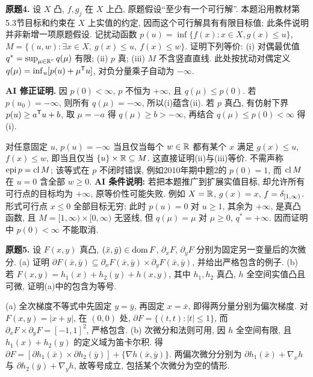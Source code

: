 \begin{exercise}\label{ass:6253-hw5-q4}
\textbf{原题4.} 设 $X$ 凸, $f,g_j$ 在 $X$ 上凸, 原题假设“至少有一个可行解”. 本题沿用教材第5.3节目标和约束在 $X$ 上实值的约定, 因而这个可行解具有有限目标值; 此条件说明并非新增一项原题假设. 记扰动函数 $p(u)=\inf\{f(x):x\in X,g(x)\le u\}$,
$M=\{(u,w):\exists x\in X,\ g(x)\le u,\ f(x)\le w\}$.
证明下列等价: (i) 对偶最优值 $q^*=\sup_{\mu\in\mathbb R^r}q(\mu)$ 有限; (ii) $p$ 真; (iii) $M$ 不含竖直直线. 此处按扰动对偶定义 $q(\mu)=\inf_u[p(u)+\mu^{\mathsf T} u]$, 对负分量乘子自动为 $-\infty$.
\end{exercise}
\begin{solution}
\textbf{AI 修正证明.} 因 $p(0)<\infty$, $p$ 不恒为 $+\infty$, 且 $q(\mu)\le p(0)$. 若 $p(u_0)=-\infty$, 则所有 $q(\mu)=-\infty$, 所以(i)蕴含(ii). 若 $p$ 真凸, 有仿射下界 $p(u)\ge a^{\mathsf T} u+b$, 取 $\mu=-a$ 得 $q(\mu)\ge b> -\infty$, 再结合 $q(\mu)\le p(0)<\infty$ 得(i).

对任意固定 $u$, $p(u)=-\infty$ 当且仅当每个 $w\in\mathbb R$ 都有某个 $x$ 满足 $g(x)\le u$, $f(x)\le w$, 即当且仅当 $\{u\}\times\mathbb R\subseteq M$. 这直接证明(ii)与(iii)等价. 不需声称 $\operatorname{epi} p=\operatorname{cl} M$; 该等式在 $p$ 不闭时错误, 例如2010年期中题2的 $p(0)=1$, 而 $\operatorname{cl} M$ 在 $u=0$ 含全部 $w\ge0$.
\textbf{AI 条件说明:} 若把本题推广到扩展实值目标, 却允许所有可行点的目标均为 $+\infty$, 原等价性可能失败. 例如 $X=\mathbb R$, $g(x)=x$, $f=\delta_{[1,\infty)}$. 形式可行点 $x\le0$ 全部目标无穷; 此时 $p(u)=0$ 对 $u\ge1$, 其余为 $+\infty$, 是真凸函数, 且 $M=[1,\infty)\times[0,\infty)$ 无竖线, 但 $q(\mu)=\mu$ 对 $\mu\ge0$, $q^*=+\infty$. 因而证明中 $p(0)<\infty$ 不能取消.
\end{solution}

\begin{exercise}\label{ass:6253-hw5-q5}
\textbf{原题5.} 设 $F(x,y)$ 真凸, $(\bar x,\bar y)\in\operatorname{dom} F$, $\partial_xF$, $\partial_yF$ 分别为固定另一变量后的次微分.
(a) 证明 $\partial F(\bar x,\bar y)\subseteq\partial_xF(\bar x,\bar y)\times\partial_yF(\bar x,\bar y)$, 并给出严格包含的例子.
(b) 若 $F(x,y)=h_1(x)+h_2(y)+h(x,y)$, 其中 $h_1,h_2$ 真凸, $h$ 全空间实值凸且可微, 证明(a)中的包含为等号.
\end{exercise}
\begin{solution}
(a) 全次梯度不等式中先固定 $y=\bar y$, 再固定 $x=\bar x$, 即得两分量分别为偏次梯度. 对 $F(x,y)=|x+y|$, 在 $(0,0)$ 处,
$\partial F=\{(t,t):|t|\le1\}$, 而 $\partial_xF\times\partial_yF=[-1,1]^2$, 严格包含.
(b) 次微分和法则可用, 因 $h$ 全空间有限, 且 $h_1(x)+h_2(y)$ 的定义域为笛卡尔积. 得
$\partial F=[\partial h_1(\bar x)\times\partial h_2(\bar y)]+\{\nabla h(\bar x,\bar y)\}$.
两偏次微分分别为 $\partial h_1(\bar x)+\nabla_x h$ 与 $\partial h_2(\bar y)+\nabla_y h$, 故等号成立, 包括某个次微分为空的情形.
\end{solution}

